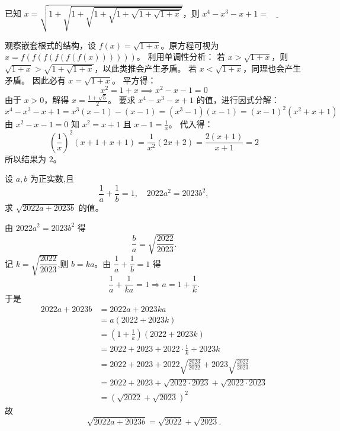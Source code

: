 \begin{questions}
\question
已知 $x = \sqrt{1 + \sqrt{1 + \sqrt{1 + \sqrt{1 + \sqrt{1 + \sqrt{1 + x}}}}}}$，则 $x^4 - x^3 - x + 1 = \underline{\qquad}$

\begin{solution}
观察嵌套根式的结构，设 $f(x) = \sqrt{1 + x}$。原方程可视为 $x = f(f(f(f(f(f(x))))))$。
利用单调性分析：
若 $x > \sqrt{1 + x}$，则 $\sqrt{1 + x} > \sqrt{1 + \sqrt{1 + x}}$，以此类推会产生矛盾。
若 $x < \sqrt{1 + x}$，同理也会产生矛盾。
因此必有 $x = \sqrt{1 + x}$。
平方得：
\[
x^2 = 1 + x \implies x^2 - x - 1 = 0
\]
由于 $x > 0$，解得 $x = \frac{1 + \sqrt{5}}{2}$。
要求 $x^4 - x^3 - x + 1$ 的值，进行因式分解：
\[
x^4 - x^3 - x + 1 = x^3(x - 1) - (x - 1) = (x^3 - 1)(x - 1) = (x - 1)^2 (x^2 + x + 1)
\]
由 $x^2 - x - 1 = 0$ 知 $x^2 = x + 1$ 且 $x - 1 = \frac{1}{x}$。
代入得：
\[
\left( \frac{1}{x} \right)^2 (x + 1 + x + 1) = \frac{1}{x^2} (2x + 2) = \frac{2(x + 1)}{x + 1} = 2
\]
所以结果为 $2$。
\end{solution}

    \question 设 $a,b$ 为正实数,且
    \[
    \frac{1}{a}+\frac{1}{b}=1,\quad 2022a^2=2023b^2,
    \]
    求 $\sqrt{2022a+2023b}$ 的值。
    \begin{solution}
        由 $2022a^2=2023b^2$ 得
        \[
        \frac{b}{a}=\sqrt{\frac{2022}{2023}}.
        \]
        记 $k=\sqrt{\dfrac{2022}{2023}}$,则 $b=ka$。由 $\dfrac{1}{a}+\dfrac{1}{b}=1$ 得
        \[
        \frac{1}{a}+\frac{1}{ka}=1 \Rightarrow a=1+\frac{1}{k}.
        \]
        于是
        \begin{align*}
        2022a+2023b
        &=2022a+2023ka\\
        &=a(2022+2023k)\\
        &=\left(1+\frac{1}{k}\right)(2022+2023k)\\
        &=2022+2023+2022\cdot\frac{1}{k}+2023k\\
        &=2022+2023+2022\sqrt{\frac{2023}{2022}}+2023\sqrt{\frac{2022}{2023}}\\
        &=2022+2023+\sqrt{2022\cdot2023}+\sqrt{2022\cdot2023}\\
        &=(\sqrt{2022}+\sqrt{2023})^2
        \end{align*}
        故
        \[
        \sqrt{2022a+2023b}=\sqrt{2022}+\sqrt{2023}.
        \]
    \end{solution}


\end{questions}
